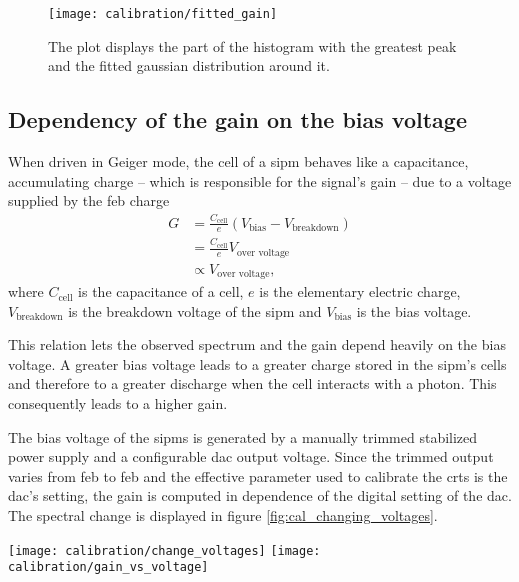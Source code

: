 \begin{figure}
  \centering
  \texttt{[image: calibration/fitted\_gain]}
  \caption{%
    The plot displays the part of the histogram with the greatest peak and the fitted gaussian distribution around it.
  }
  \label{fig:cal_fitted_gain}
\end{figure}

\subsection{Dependency of the gain on the bias voltage}

When driven in Geiger mode, the cell of a \gls{sipm} behaves like a capacitance, accumulating charge -- which is responsible for the signal's gain -- due to a voltage supplied by the \gls{feb} charge
\begin{align}
  G &= \frac{C_\text{cell}}{e} (V_\text{bias} - V_\text{breakdown}) \label{eq:the_relation} \\
    &= \frac{C_\text{cell}}{e} V_\text{over voltage}  \\
    &\propto V_\text{over voltage},
\end{align}
where $C_\text{cell}$ is the capacitance of a cell, $e$ is the elementary electric charge,  $V_\text{breakdown}$ is the breakdown voltage of the \gls{sipm} and $V_\text{bias}$ is the bias voltage.

This relation lets the observed spectrum and the gain depend heavily on the bias voltage.
A greater bias voltage leads to a greater charge stored in the \gls{sipm}'s cells and therefore to a greater discharge when the cell interacts with a photon.
This consequently leads to a higher gain.

The bias voltage of the \glspl{sipm} is generated by a manually trimmed stabilized power supply and a configurable \gls{dac} output voltage.
Since the trimmed output varies from \gls{feb} to \gls{feb} and the effective parameter used to calibrate the \glspl{crt} is the \gls{dac}'s setting, the gain is computed in dependence of the digital setting of the \gls{dac}.
The spectral change is displayed in figure \ref{fig:cal_changing_voltages}.

\begin{figure*}
  \centering
  \texttt{[image: calibration/change\_voltages]}
  \texttt{[image: calibration/gain\_vs\_voltage]}
  \caption{%
    The plot on the left displays spectra of a \gls{sipm} for increasing bias \gls{dac} output.
    It is clearly visible, that the spectrum shifts to the right with greater \gls{dac} setting.
    It is also visible, that the distance between the peaks increases with greater \gls{dac} setting.
    The plot on the right displays the dependence of the gain on the \gls{dac} setting.
  }
  \label{fig:cal_changing_voltages}
\end{figure*}

